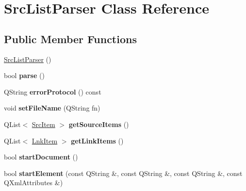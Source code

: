 \hypertarget{classSrcListParser}{
\section{SrcListParser Class Reference}
\label{classSrcListParser}
}
\subsection*{Public Member Functions}
\begin{DoxyCompactItemize}
\item 
\hyperlink{classSrcListParser_aa566540ba3c5097a8e497fd0e7acbcca}{SrcListParser} ()
\item 
\hypertarget{classSrcListParser_a7d1b811a4779131bb8e76238d8c19702}{
bool {\bfseries parse} ()}
\label{classSrcListParser_a7d1b811a4779131bb8e76238d8c19702}

\item 
\hypertarget{classSrcListParser_aeaf9cf12be695d96b7038be5d24ae88e}{
QString {\bfseries errorProtocol} () const }
\label{classSrcListParser_aeaf9cf12be695d96b7038be5d24ae88e}

\item 
\hypertarget{classSrcListParser_a59b59b6b1fc9c5811bc8c27c13a26ee2}{
void {\bfseries setFileName} (QString fn)}
\label{classSrcListParser_a59b59b6b1fc9c5811bc8c27c13a26ee2}

\item 
\hypertarget{classSrcListParser_a697a200561d99b402b1f6d355a48c3c4}{
QList$<$ \hyperlink{structSrcItem}{SrcItem} $>$ {\bfseries getSourceItems} ()}
\label{classSrcListParser_a697a200561d99b402b1f6d355a48c3c4}

\item 
\hypertarget{classSrcListParser_aac248cf48da5d6a973c08b0e758f2859}{
QList$<$ \hyperlink{structLnkItem}{LnkItem} $>$ {\bfseries getLinkItems} ()}
\label{classSrcListParser_aac248cf48da5d6a973c08b0e758f2859}

\item 
\hypertarget{classSrcListParser_a2a2f9f39445c888520bf855509eb6321}{
bool {\bfseries startDocument} ()}
\label{classSrcListParser_a2a2f9f39445c888520bf855509eb6321}

\item 
\hypertarget{classSrcListParser_a0a748640f9e615353f126abd1f095209}{
bool {\bfseries startElement} (const QString \&, const QString \&, const QString \&, const QXmlAttributes \&)}
\label{classSrcListParser_a0a748640f9e615353f126abd1f095209}


\end{DoxyCompactItemize}
